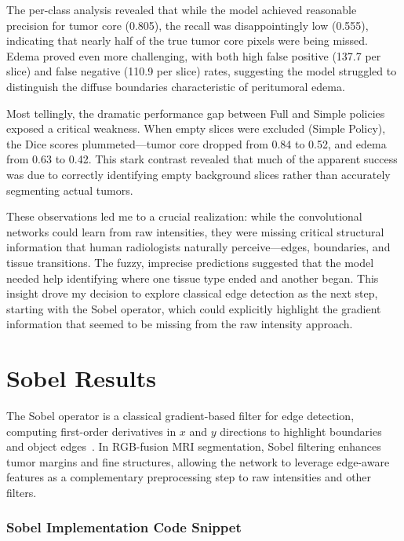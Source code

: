 The per-class analysis revealed that while the model achieved reasonable precision for tumor core (0.805), the recall was disappointingly low (0.555), indicating that nearly half of the true tumor core pixels were being missed. Edema proved even more challenging, with both high false positive (137.7 per slice) and false negative (110.9 per slice) rates, suggesting the model struggled to distinguish the diffuse boundaries characteristic of peritumoral edema.

Most tellingly, the dramatic performance gap between Full and Simple policies exposed a critical weakness. When empty slices were excluded (Simple Policy), the Dice scores plummeted—tumor core dropped from 0.84 to 0.52, and edema from 0.63 to 0.42. This stark contrast revealed that much of the apparent success was due to correctly identifying empty background slices rather than accurately segmenting actual tumors.

These observations led me to a crucial realization: while the convolutional networks could learn from raw intensities, they were missing critical structural information that human radiologists naturally perceive—edges, boundaries, and tissue transitions. The fuzzy, imprecise predictions suggested that the model needed help identifying where one tissue type ended and another began. This insight drove my decision to explore classical edge detection as the next step, starting with the Sobel operator, which could explicitly highlight the gradient information that seemed to be missing from the raw intensity approach.


\section{Sobel Results}
\label{sec:sobel_results}

The Sobel operator is a classical gradient-based filter for edge detection, computing first-order derivatives in $x$ and $y$ directions to highlight boundaries and object edges~\cite{sobel1968isotropic}. In RGB-fusion MRI segmentation, Sobel filtering enhances tumor margins and fine structures, allowing the network to leverage edge-aware features as a complementary preprocessing step to raw intensities and other filters.

\clearpage


\subsubsection{Sobel Implementation Code Snippet}

